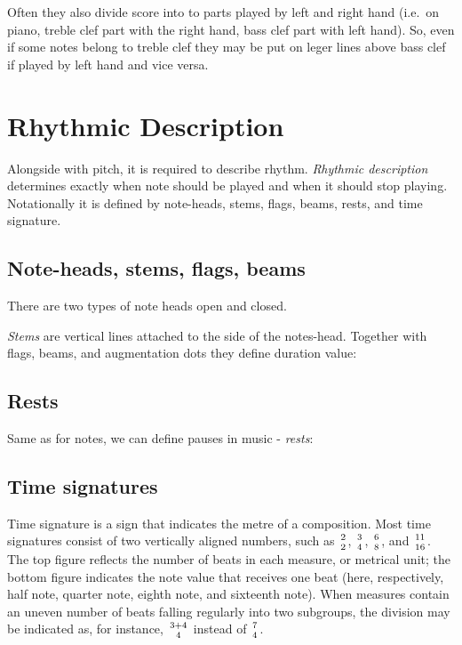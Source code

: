 \figcenter{}

Often they also divide score into to parts played by left and right hand (i.e.\ on piano, treble clef part with
the right hand, bass clef part with left hand). So, even if some notes belong to treble clef they may be put on leger
lines above bass clef if played by left hand and vice versa.

\figcenter{}


\section{Rhythmic Description}\label{sec:rhythmic-description}
Alongside with pitch, it is required to describe rhythm. \textit{Rhythmic description} determines exactly when note
should be played and when it should stop playing. Notationally it is defined by note-heads, stems, flags, beams, rests,
and time signature.

\subsection{Note-heads, stems, flags, beams}\label{subsec:note-heads}

There are two types of note heads open and closed.
\figcenter{}

\textit{Stems} are vertical lines attached to the side of the notes-head. Together with flags, beams, and augmentation
dots they define duration value:



\subsection{Rests}\label{subsec:rests}
Same as for notes, we can define pauses in music - \textit{rests}:



\subsection{Time signatures}\label{subsec:time-signatures}
Time signature is a sign that indicates the metre of a composition. Most time signatures consist of two vertically
aligned numbers, such as $2\atop2$, $3\atop4$, $6\atop8$, and $11\atop16$. The top figure reflects the number of beats
in each measure, or metrical unit; the bottom figure indicates the note value that receives one beat (here,
respectively, half note, quarter note, eighth note, and sixteenth note). When measures contain an uneven number of
beats falling regularly into two subgroups, the division may be indicated as, for instance, ${3+4}\atop4$ instead
of $7\atop4$\cite{time-signature}.

